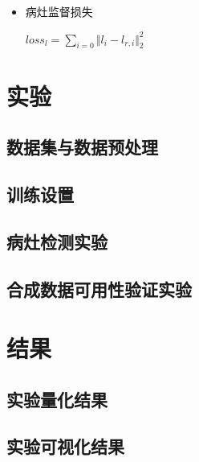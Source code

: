 \documentclass[letterpaper]{article} %
\begin{document}
\begin{itemize}
	\item 病灶监督损失
	
	\begin{center}
		$loss_{l}=\sum\limits_{i=0}\Vert{l_i-l_{r,i}}\Vert_{2}^{2}$
	\end{center}
	
\end{itemize}

\section{实验}
\subsection{数据集与数据预处理}
\subsection{训练设置}
\subsection{病灶检测实验}
\subsection{合成数据可用性验证实验}

\section{结果}
\subsection{实验量化结果}
\subsection{实验可视化结果}
\end{document}
